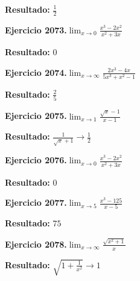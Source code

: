 \documentclass[10pt,a4paper]{article}
\begin{document}
\begin{solbox}
\textbf{Resultado:} \(\displaystyle \frac{1}{2}\)
\end{solbox}

\begin{ejbox}
\textbf{Ejercicio 2073.}\quad $\lim_{x\to 0} \frac{x^3-2x^2}{x^2+3x}$
\end{ejbox}

\begin{solbox}
\textbf{Resultado:} \(\displaystyle 0\)
\end{solbox}

\begin{ejbox}
\textbf{Ejercicio 2074.}\quad $\lim_{x\to \infty} \frac{2x^3 - 4x}{5x^3 + x^2 - 1}$
\end{ejbox}

\begin{solbox}
\textbf{Resultado:} \(\displaystyle \frac{2}{5}\)
\end{solbox}

\newpage
\begin{ejbox}
\textbf{Ejercicio 2075.}\quad $\lim_{x\to 1} \frac{\sqrt{x}-1}{x-1}$
\end{ejbox}

\begin{solbox}
\textbf{Resultado:} \(\displaystyle \frac{1}{\sqrt{x}+1} \to \frac{1}{2}\)
\end{solbox}

\begin{ejbox}
\textbf{Ejercicio 2076.}\quad $\lim_{x\to 0} \frac{x^3-2x^2}{x^2+3x}$
\end{ejbox}

\begin{solbox}
\textbf{Resultado:} \(\displaystyle 0\)
\end{solbox}

\begin{ejbox}
\textbf{Ejercicio 2077.}\quad $\lim_{x\to 5} \frac{x^3-125}{x-5}$
\end{ejbox}

\begin{solbox}
\textbf{Resultado:} \(\displaystyle 75\)
\end{solbox}

\newpage
\begin{ejbox}
\textbf{Ejercicio 2078.}\quad $\lim_{x\to \infty} \frac{\sqrt{x^2+1}}{x}$
\end{ejbox}

\begin{solbox}
\textbf{Resultado:} \(\displaystyle \sqrt{1+\frac{1}{x^2}} \to 1\)
\end{solbox}
\end{document}
